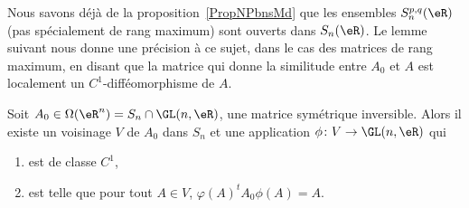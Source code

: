 Nous savons déjà de la proposition~\ref{PropNPbnsMd} que les ensembles \( S_n^{p,q}(\eR)\) (pas spécialement de rang maximum) sont ouverts dans \( S_n(\eR)\). Le lemme suivant nous donne une précision à ce sujet, dans le cas des matrices de rang maximum, en disant que la matrice qui donne la similitude entre \( A_0\) et \( A\) est localement un \( C^1\)-difféomorphisme de \( A\).
\begin{lemma}   \label{LemWLCvLXe}
    Soit \( A_0\in \Omega(\eR^n)= S_n\cap\GL(n,\eR)\), une matrice symétrique inversible. Alors il existe un voisinage \( V\) de \( A_0\) dans \( S_n\) et une application \( \phi\colon V\to \GL(n,\eR)\) qui
    \begin{enumerate}
        \item
            est de classe \( C^1\),
        \item
            est telle que pour tout \( A\in V\), \( \varphi(A)^t A_0\phi(A)=A\).
    \end{enumerate}
\end{lemma}

